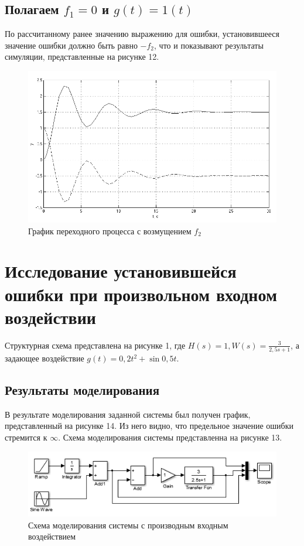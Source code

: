 \documentclass[a4paper, 11pt, russian]{article}
\begin{document}
    \subsection{Полагаем $f_1 = 0$ и $g(t) = 1(t)$}
    По рассчитанному ранее значению выражению для ошибки, установившееся значение ошибки должно быть равно $-f_2$, что и показывают результаты симуляции, представленные на рисунке 12.
    
    \begin{figure}[ht!]
        \centering
        \includegraphics[scale = 0.7]{disturbance2.png}
        \caption{График переходного процесса с возмущением $f_2$}
    \end{figure}
    
    \section{Исследование установившейся ошибки при произвольном входном воздействии}
    Структурная схема представлена на рисунке 1, где $H(s) = 1, W(s) = \displaystyle{\frac{3}{2,5s + 1}}$, а задающее воздействие $g(t) = 0,2t^2 + \sin{0,5t}$.
    \subsection{Результаты моделирования}
    В результате моделирования заданной системы был получен график, представленный на рисунке 14. Из него видно, что предельное значение ошибки стремится к $\infty$. Схема моделирования системы представленна на рисунке 13.
    \begin{figure}[h!]
        \centering
        \includegraphics[scale = 1]{customSourceScheme.PNG}
        \caption{Схема моделирования системы с производным входным воздействием}
    \end{figure}
    
\end{document}
